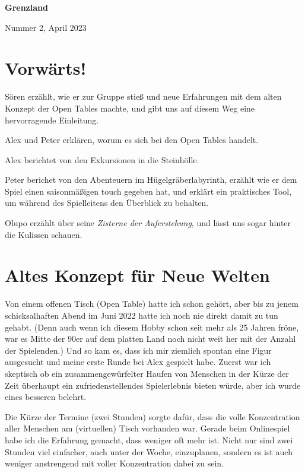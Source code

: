 \documentclass[11pt]{wbzine}
\begin{document}


\shipout\null
\addtocounter{page}{-1}

{\bfseries\fontsize{70}{55}
 \selectfont Grenzland \par}%
 \hrulefill
 Nummer 2, April 2023

\begin{multicols}{2}

\tableofcontents

\section{Vorwärts!}

Sören erzählt, wie er zur Gruppe stieß und neue Erfahrungen mit dem
alten Konzept der Open Tables machte, und gibt uns auf diesem
Weg eine hervorragende Einleitung.

Alex und Peter erklären, worum es sich bei den Open Tables handelt.

Alex berichtet von den Exkursionen in die Steinhölle.

Peter berichet von den Abenteuern im Hügelgräberlabyrinth, erzählt
wie er dem Spiel einen saisonmäßigen touch gegeben hat, und
erklärt ein praktisches Tool, um während des Spielleitens den
Überblick zu behalten.

Olupo erzählt über seine \textit{Zisterne der Auferstehung}, und
lässt uns sogar hinter die Kulissen schauen.


\section{Altes Konzept für Neue Welten}
Von einem offenen Tisch (Open Table) hatte ich schon gehört, aber bis
zu jenem schicksalhaften Abend im Juni 2022 hatte ich noch nie direkt
damit zu tun gehabt. (Denn auch wenn ich diesem Hobby schon seit mehr
als 25 Jahren fröne, war es Mitte der 90er auf dem platten Land noch
nicht weit her mit der Anzahl der Spielenden.) Und so kam es, dass ich
mir ziemlich spontan eine Figur ausgesucht und meine erste Runde bei Alex
gespielt habe. Zuerst war ich skeptisch ob ein zusammengewürfelter Haufen
von Menschen in der Kürze der Zeit überhaupt ein zufriedenstellendes
Spielerlebnis bieten würde, aber ich wurde eines besseren belehrt.

Die Kürze der Termine (zwei Stunden) sorgte dafür, dass die volle
Konzentration aller Menschen am (virtuellen) Tisch vorhanden war. Gerade
beim Onlinespiel habe ich die Erfahrung gemacht, dass weniger oft
mehr ist. Nicht nur sind zwei Stunden viel einfacher, auch unter der
Woche, einzuplanen, sondern es ist auch weniger anstrengend mit voller
Konzentration dabei zu sein.


\end{multicols}
\end{document}
